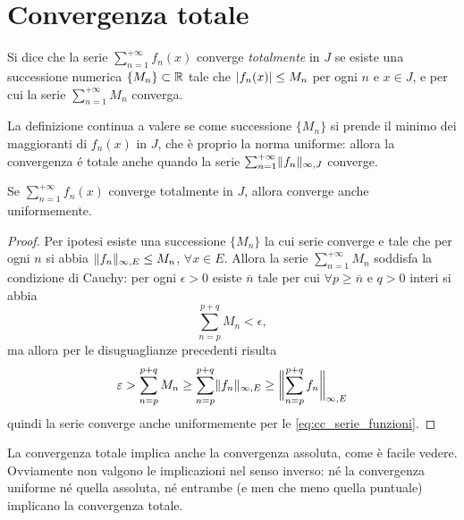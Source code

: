 \section{Convergenza totale}
\begin{definizione}
Si dice che la serie $\sum_{n=1}^{+\infty}f_n(x)$ converge \emph{totalmente} in $J$ se esiste una successione numerica $\{M_n\}\subset\R$ tale che $\abs{f_n(x)}\leq M_n$ per ogni $n$ e $x\in J$, e per cui la serie $\sum_{n=1}^{+\infty}M_n$ converga.
\end{definizione}
La definizione continua a valere se come successione $\{M_n\}$ si prende il minimo dei maggioranti di $f_n(x)$ in $J$, che è proprio la norma uniforme: allora la convergenza é totale anche quando la serie $\sum_{n=1}^{+\infty}\norm{f_n}_{\infty,J}$ converge.
\begin{teorema}[Weierstrass]
Se $\sum_{n=1}^{+\infty}f_n(x)$ converge totalmente in $J$, allora converge anche uniformemente.
\end{teorema}
\begin{proof}
Per ipotesi esiste una successione $\{M_n\}$ la cui serie converge e tale che per ogni $n$ si abbia $\norm{f_n}_{\infty,E}\leq M_n$, $\forall x\in E$. Allora la serie $\sum_{n=1}^{+\infty}M_n$ soddisfa la condizione di Cauchy: per ogni $\epsilon>0$ esiste $\overline{n}$ tale per cui $\forall p\geq\overline{n}$ e $q>0$ interi si abbia
\[
\sum_{n=p}^{p+q}M_n<\epsilon,
\]
ma allora per le disuguaglianze precedenti risulta
\[
	\epsilon>\sum_{n=p}^{p+q}M_n\geq\sum_{n=p}^{p+q}\norm{f_n}_{\infty,E}\geq\norm[\bigg]{\sum_{n=p}^{p+q}f_n}_{\infty,E}
\]
quindi la serie converge anche uniformemente per le \eqref{eq:cc_serie_funzioni}.
\end{proof}
La convergenza totale implica anche la convergenza assoluta, come è facile vedere. Ovviamente non valgono le implicazioni nel senso inverso: né la convergenza uniforme né quella assoluta, né entrambe (e men che meno quella puntuale) implicano la convergenza totale.
